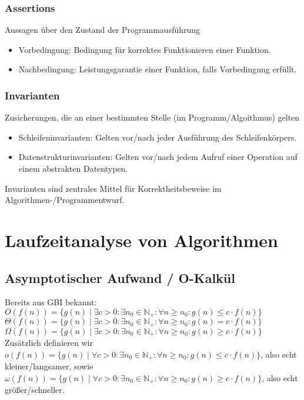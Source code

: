 \documentclass{article}
\newcommand{\N}{\mathbb{N_+}} %
\newcommand{\important}[1]{\textcolor{importantColor}{#1}}
\newcommand{\set}[1]{\{#1\}}
\newcommand{\anfuehrung}[1]{\flqq #1\frqq}
\begin{document}
\subsubsection{Assertions}
Aussagen über den Zustand der Programmausführung
\begin{itemize}
    \item \important{Vorbedingung}: Bedingung für korrektes Funktionieren einer Funktion.
    \item \important{Nachbedingung}: Leistungsgarantie einer Funktion, falls Vorbedingung erfüllt.
\end{itemize}

\subsubsection{Invarianten}
Zusicherungen, die an einer bestimmten Stelle (im Programm/Algoithmus) gelten
\begin{itemize}
    \item \important{Schleifeninvarianten}: Gelten vor/nach jeder Ausführung des Schleifenkörpers.
    \item \important{Datenstrukturinvarianten}: Gelten vor/nach jedem Aufruf einer Operation auf einem abstrakten Datentypen.
\end{itemize}
Invarianten sind zentrales Mittel für Korrektheitsbeweise im Algorithmen-/Programmentwurf.

\newpage
\section{Laufzeitanalyse von Algorithmen}
\subsection{Asymptotischer Aufwand / O-Kalkül}
Bereits aus GBI bekannt:\\
$O(f(n))=\set{g(n)\mid\exists c > 0: \exists n_0\in\N:\forall n \geq n_0:g(n)\leq c\cdot f(n)}$\\
$\Theta(f(n))=\set{g(n)\mid\exists c > 0: \exists n_0\in\N:\forall n \geq n_0:g(n)= c\cdot f(n)}$\\
$\Omega(f(n))=\set{g(n)\mid\exists c > 0: \exists n_0\in\N:\forall n \geq n_0:g(n)\geq c\cdot f(n)}$\\
Zusätzlich definieren wir \\
$o(f(n))=\set{g(n)\mid\forall c > 0: \exists n_0\in\N:\forall n \geq n_0:g(n)\leq c\cdot f(n)}$, also \anfuehrung{echt kleiner/langsamer}, sowie\\
$\omega(f(n))=\set{g(n)\mid\forall c > 0: \exists n_0\in\N:\forall n \geq n_0:g(n)\geq c\cdot f(n)}$, also  \anfuehrung{echt größer/schneller}.
\end{document}
